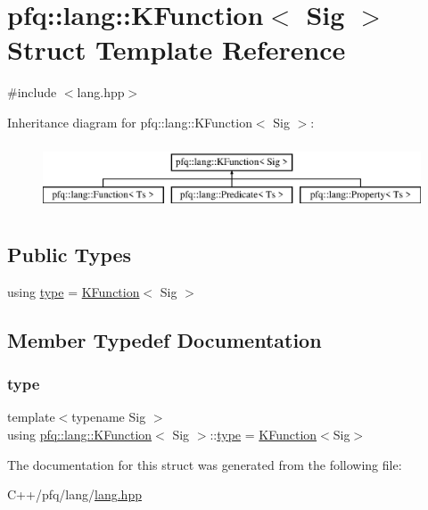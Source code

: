 \hypertarget{structpfq_1_1lang_1_1KFunction}{}\section{pfq\+:\+:lang\+:\+:K\+Function$<$ Sig $>$ Struct Template Reference}
\label{structpfq_1_1lang_1_1KFunction}


{\ttfamily \#include $<$lang.\+hpp$>$}

Inheritance diagram for pfq\+:\+:lang\+:\+:K\+Function$<$ Sig $>$\+:\begin{figure}[H]
\begin{center}
\leavevmode
\includegraphics[height=2.000000cm]{structpfq_1_1lang_1_1KFunction}
\end{center}
\end{figure}
\subsection*{Public Types}
\begin{DoxyCompactItemize}
\item 
using \hyperlink{structpfq_1_1lang_1_1KFunction_ac90a796d5d177b90cc663d1ab60acaa7}{type} = \hyperlink{structpfq_1_1lang_1_1KFunction}{K\+Function}$<$ Sig $>$
\end{DoxyCompactItemize}


\subsection{Member Typedef Documentation}
\mbox{\label{structpfq_1_1lang_1_1KFunction_ac90a796d5d177b90cc663d1ab60acaa7}} 
\subsubsection{\texorpdfstring{type}{type}}
{\footnotesize\ttfamily template$<$typename Sig $>$ \\
using \hyperlink{structpfq_1_1lang_1_1KFunction}{pfq\+::lang\+::\+K\+Function}$<$ Sig $>$\+::\hyperlink{structpfq_1_1lang_1_1KFunction_ac90a796d5d177b90cc663d1ab60acaa7}{type} =  \hyperlink{structpfq_1_1lang_1_1KFunction}{K\+Function}$<$Sig$>$}



The documentation for this struct was generated from the following file\+:\begin{DoxyCompactItemize}
\item 
C++/pfq/lang/\hyperlink{lang_8hpp}{lang.\+hpp}\end{DoxyCompactItemize}
